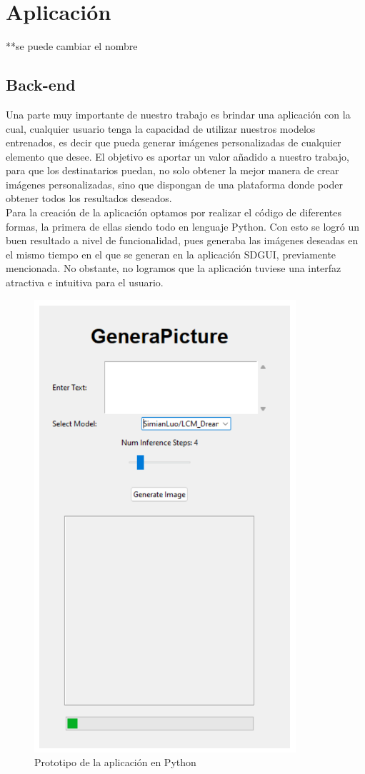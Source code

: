 \chapter{Aplicación}
\label{cap:descripcionTrabajo}

**se puede cambiar el nombre

\section{Back-end}
Una parte muy importante de nuestro trabajo es brindar una aplicación con la cual, cualquier usuario tenga la capacidad de utilizar nuestros modelos entrenados, es decir que pueda generar imágenes personalizadas de cualquier elemento que desee. El objetivo es aportar un valor añadido a nuestro trabajo, para que los destinatarios puedan, no solo obtener la mejor manera de crear imágenes personalizadas, sino que dispongan de una plataforma donde poder obtener todos los resultados deseados.\\

Para la creación de la aplicación optamos por realizar el código de diferentes formas, la primera de ellas siendo todo en lenguaje Python. Con esto se logró un buen resultado a nivel de funcionalidad, pues generaba las imágenes deseadas en el mismo tiempo en el que se generan en la aplicación SDGUI, previamente mencionada. No obstante, no logramos que la aplicación tuviese una interfaz atractiva e intuitiva para el usuario.\\

\begin{figure}[!htb]
	\centering
	\includegraphics[width = 0.7
	\textwidth]{Imagenes/Vectorial/app1.png}
	\caption{Prototipo de la aplicación en Python}
	\label{fig:app1}
\end{figure}

